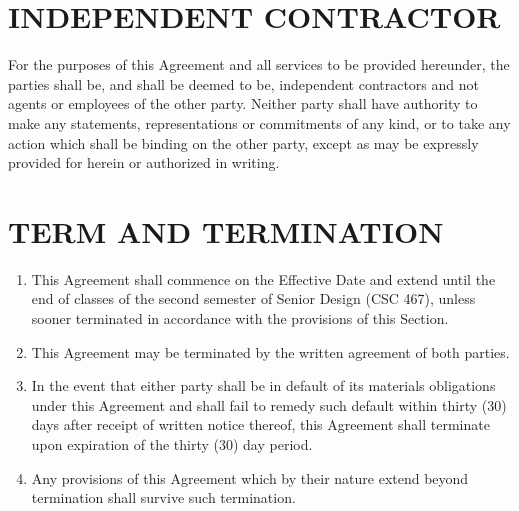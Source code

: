 \section{INDEPENDENT CONTRACTOR}  

For the purposes of this Agreement and all services to be provided hereunder, the parties shall be, and shall be deemed to be, independent contractors and not agents or employees of the other party. Neither party shall have authority to make any statements, representations or commitments of any kind, or to take any action which shall be binding on the other party, except as may be expressly provided for herein or authorized in writing.  

\section{TERM AND TERMINATION }    
\begin{enumerate}  \itemsep4pt \parskip0pt 
\item This Agreement shall commence on the Effective Date and extend until the end of classes of the second semester of Senior Design (CSC 467), unless sooner terminated in accordance with the provisions of this Section. 

\item This Agreement may be terminated by the written agreement of both       parties.    

\item In the event that either party shall be in default of its       materials obligations under this Agreement and shall fail to       remedy such default within thirty (30) days after receipt of       written notice thereof, this Agreement shall terminate upon       expiration of the thirty (30) day period.    

\item Any provisions of this Agreement which by their nature extend       beyond termination shall survive such termination.  
\end{enumerate}




